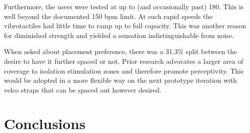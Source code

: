 Furthermore, the users were tested at up to (and occasionally past) 180. This is well beyond the documented 150 bpm limit. At such rapid speeds the vibrotactiles had little time to ramp up to full capacity. This was another reason for diminished strength and yielded a sensation indistinguishable from noise.

When asked about placement preference, there was a 31.3\% split between the desire to have it further spaced or not. Prior research advocates a larger area of coverage to isolation stimulation zones and therefore promote perceptivity. This would be adopted in a more flexible way on the next prototype iteration with velco straps that can be spaced out however desired.

\section{Conclusions}
